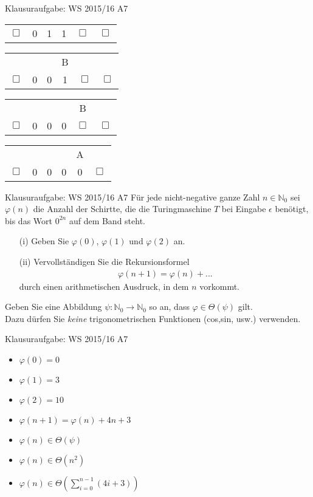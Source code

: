 \begin{frame}{Klausuraufgabe: WS 2015/16 A7}
\begin{minipage}[t!]{0.4\textwidth}
\begin{center}
\begin{tabular}{cccccc}
        $\Box$ & 0 & 1 & 1 & $\Box$ & $\Box$ \\
      \end{tabular}
      \begin{tabular}{cccccc}
        & & & B & & \\
        $\Box$ & 0 & 0 & 1 & $\Box$ & $\Box$ \\
      \end{tabular}
      \begin{tabular}{cccccc}
        & & & & B & \\
        $\Box$ & 0 & 0 & 0 & $\Box$ & $\Box$ \\
      \end{tabular}
      \begin{tabular}{cccccc}
        & & & & A & \\
        $\Box$ & 0 & 0 & 0 & 0 & $\Box$ \\
      \end{tabular}
    \end{center}
  \end{minipage}
\end{frame}

\begin{frame}{Klausuraufgabe: WS 2015/16 A7}
  Für jede nicht-negative ganze Zahl $n\in\mathbb{N}_0$ sei $\varphi (n)$ die Anzahl der Schirtte, die die Turingmaschine $T$ bei Eingabe $\epsilon$ benötigt, bis das Wort $0^{2n}$ auf dem Band steht.
  \begin{itemize}
    \item[(i)] Geben Sie $\varphi (0)$, $\varphi (1)$ und $\varphi (2)$ an.
    \item[(ii)] Vervollständigen Sie die Rekursionsformel
      \begin{align*}
        \varphi (n+1) = \varphi (n) + ...
      \end{align*}
      durch einen arithmetischen Ausdruck, in dem $n$ vorkommt.
  \end{itemize}
  Geben Sie eine Abbildung $\psi : \mathbb{N}_0\rightarrow\mathbb{N}_0$ so an, dass $\varphi\in\Theta (\psi )$ gilt.\\
  Dazu dürfen Sie \textit{keine} trigonometrischen Funktionen (cos,sin, usw.) verwenden.
\end{frame}

\begin{frame}{Klausuraufgabe: WS 2015/16 A7}
  \begin{itemize}
    \item $\varphi (0)=0$
    \item $\varphi (1)=3$
    \item $\varphi (2)=10$
    \pause
    \item $\varphi (n+1)=\varphi (n)+4n+3$
    \pause
    \item $\varphi (n) \in \Theta (\psi)$
    \pause
    \item $\varphi (n) \in \Theta (n^2)$
    \pause
    \item $\varphi (n) \in \Theta (\sum_{i=0}^{n-1}(4i+3))$
  \end{itemize}
\end{frame}

